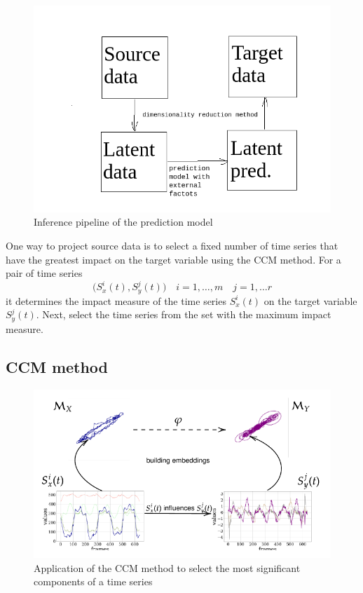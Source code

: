 \documentclass[bst/sn-mathphys]{sn-jnl}%
\theoremstyle{thmstyleone}%
\theoremstyle{thmstyletwo}%
\theoremstyle{thmstylethree}%
\begin{document}
\begin{figure}[bhtp]
	\includegraphics[width=\textwidth]{paint_diagram.png}
	\caption{Inference pipeline of the prediction model}
\end{figure}


One way to project source data is to select a fixed number of time series that have the greatest impact on the target variable using the CCM method.
For a pair of time series
\begin{equation*}
	\bigl(S_x^i(t), S_y^j(t) \bigr) \quad i = 1, \ldots, m \quad j = 1, \ldots r
\end{equation*} 
it determines the impact measure of the time series $S_x^i(t)$ on the target variable $S_y^j(t)$.
Next, select the time series from the set with the maximum impact measure.

\subsection{CCM method}
\begin{figure}[bhtp]
	\includegraphics[width=\textwidth]{block_scheme_4.pdf}
	\caption{Application of the CCM method to select the most significant components of a time series}
	\label{fig:schema}
\end{figure}
\end{document}
